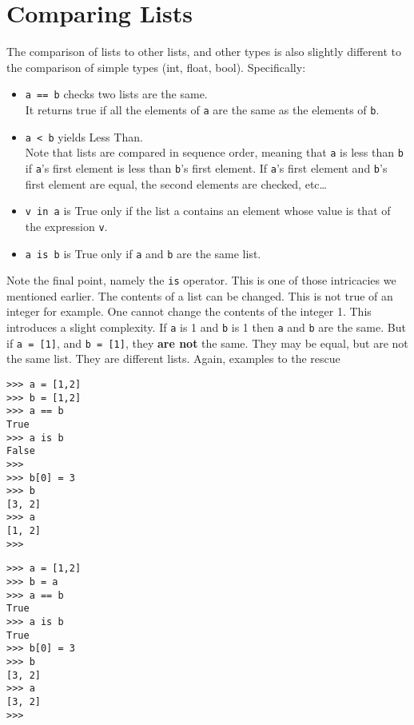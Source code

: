 \section{Comparing Lists}

The comparison of lists to other lists, and other types is also   slightly different to the comparison of simple types (int, float,   bool). Specifically:
\begin{itemize}
	\item 
\texttt{a == b} checks two lists are the same. \\
It returns true if all the elements of \texttt{a} are the same as the elements of \texttt{b}.
	\item 
\texttt{a < b} yields Less Than. \\
Note that lists are    compared in sequence order, meaning that \texttt{a} is less than \texttt{b} if    \texttt{a}'s first element is less than \texttt{b}'s first element. If \texttt{a}'s first    element and \texttt{b}'s first element are equal, the second elements are    checked, etc\ldots
	\item 
\texttt{v in a} is True only if the list a contains an    element whose value is that of the expression \texttt{v}.
	\item 
\texttt{a is b} is True only if \texttt{a} and \texttt{b} are the same    list.
\end{itemize}

Note the final point, namely the \texttt{is} operator. This is one of those   intricacies we mentioned earlier. The contents of a list can be   changed. This is not true of an integer for example. One cannot change   the contents of the integer 1. This introduces a slight complexity. If   \texttt{a} is 1 and \texttt{b} is 1 then \texttt{a} and \texttt{b} are the same. But if 
\texttt{a =   [1]}, and 
\texttt{b = [1]}, they \textbf{are not} the   same. They may be equal, but are not the same list. They are different   lists. Again, examples to the rescue
\begin{lstlisting}
>>> a = [1,2]
>>> b = [1,2]
>>> a == b
True
>>> a is b
False
>>>
>>> b[0] = 3
>>> b
[3, 2]
>>> a
[1, 2]
>>>
\end{lstlisting}
\begin{lstlisting}
>>> a = [1,2]
>>> b = a
>>> a == b
True
>>> a is b
True
>>> b[0] = 3
>>> b
[3, 2]
>>> a
[3, 2]
>>>
\end{lstlisting}

